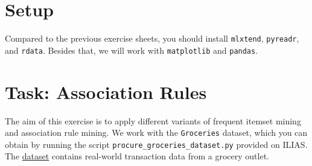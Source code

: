 \documentclass[12pt]{article}
\newcommand{\code}[1]{\textcolor{kitgreen}{\texttt{#1}}}
\begin{document}
\section*{Setup}

Compared to the previous exercise sheets, you should install \code{mlxtend}, \code{pyreadr}, and \code{rdata}.
Besides that, we will work with \code{matplotlib} and \code{pandas}.

\section*{Task: Association Rules}

The aim of this exercise is to apply different variants of frequent itemset mining and association rule mining.
We work with the \code{Groceries} dataset, which you can obtain by running the script \code{procure\_groceries\_dataset.py} provided on ILIAS.
The \href{https://rdrr.io/cran/arules/man/Groceries.html}{dataset} contains real-world transaction data from a grocery outlet.
\end{document}
